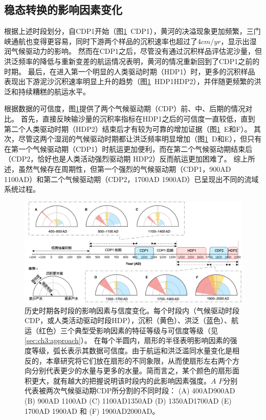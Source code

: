 \subsection{稳态转换的影响因素变化}

根据上述时段划分，自CDP1开始（图\ref{fig:ch3:impacts}~CDP1），黄河的决溢现象更加频繁，三门峡通航也变得更容易，同时下游两个样品的沉积速率也超过了$4cm/yr$，显示出湿润气候驱动力的影响。
然而在CDP1之后，尽管没有通过沉积样品评估泥沙量，但洪泛频率的降低与重新变差的航运情况表明，黄河的情况重新回到了CDP1之前的时期。
最后，在进入第一个明显的人类驱动时期（HDP1）时，更多的沉积样品表现出下游泥沙沉积速率明显上升的趋势（图\ref{fig:ch3:impacts}~HDP1\textendash{}HDP2），并伴随更频繁的洪泛和持续糟糕的航运水平。


根据数据的可信度，图\ref{fig:ch3:impacts}提供了两个气候驱动期（CDP）前、中、后期的情况对比。
首先，直接反映输沙量的沉积率指标在HDP1之后的可信度一直较低，直到第二个人类驱动时期（HDP2）结束后才有较为可靠的增加证据（图\ref{fig:ch3:impacts}~E和F）。
其次，尽管这两个湿润的气候驱动时期都让洪泛频率明显增加（图\ref{fig:ch3:impacts}~D和E），但只有在第一个气候驱动期（CDP1）时航运更加便利，而在第二个气候驱动期结束后（CDP2，恰好也是人类活动强烈驱动期 HDP2）反而航运更加困难了。
综上所述，虽然气候存在周期性，但第一个强烈的气候驱动期（CDP1，900AD \textendash{} 1100AD）和第二个气候驱动期（CDP2，1700AD \textendash{} 1900AD）已呈现出不同的流域系统过程。

\begin{figure}[!ht] %
    \includegraphics[width=\textwidth]{img/ch3/ch3_impacts.png}
    \caption[历史时期各时段的影响因素与信度变化]{历史时期各时段的影响因素与信度变化。每个时段内（气候驱动时段CDP，或人类活动驱动时段HDP），沉积（黄色）、洪泛（蓝色）、航运（红色）三个典型受影响因素的特征等级与可信度等级（见\ref{sec:ch3:approach}）。
    在每个半圆内，扇形的半径表明影响因素的强度等级，弧长表示其数据可信度。由于航运和洪泛滥同水量变化是相反的，本章研究将它们放在扇形的不同象限，从而使扇形左右两个方向分别代表更少的水量与更多的水量。简而言之，某个颜色的扇形面积更大，就有越大的把握说明该时段内的此影响因素强度。$A$ \textendash{} $F$分别代表被两次气候驱动期CDP所分割的不同时段： (A) 400AD\textendash{}900AD (B) 900AD \textendash{} 1100AD (C) 1100AD\textendash{}1350AD (D) 1350AD\textendash{}1700AD (E) 1700AD \textendash{} 1900AD 和 (F) 1900AD\textendash{}2000AD。}\label{fig:ch3:impacts}
\end{figure}
